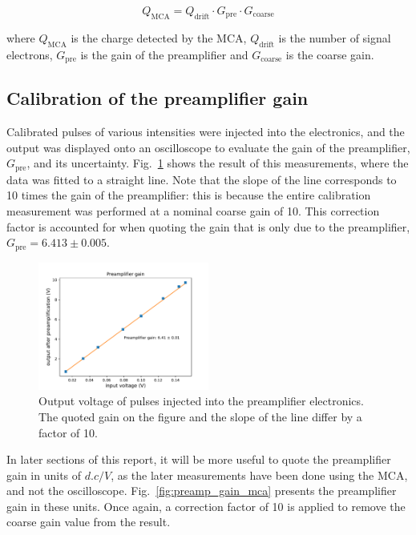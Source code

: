 \begin{equation}
  \label{eq:gain_system}
  Q_\mathrm{MCA} = Q_\mathrm{drift}\cdot G_\mathrm{pre}\cdot G_\mathrm{coarse}
\end{equation}

where $Q_\mathrm{MCA}$ is the charge detected by the MCA, $Q_\mathrm{drift}$ is the number of signal electrons, $G_\mathrm{pre}$ is the gain of the preamplifier and $G_\mathrm{coarse}$ is the coarse gain.

\subsection{Calibration of the preamp\-li\-fi\-er gain}
 Calibrated pulses of various intensities were injected into the electronics, and the output was displayed onto an oscilloscope to evaluate the gain of the preamplifier, $G_\mathrm{pre}$, and its uncertainty. Fig.~\ref{fig:preamp_gain} shows the result of this measurements, where the data was fitted to a straight line. Note that the slope of the line corresponds to 10 times the gain of the preamplifier: this is because the entire calibration measurement was performed at a nominal coarse gain of 10. This correction factor is accounted for when quoting the gain that is only due to the preamplifier, $G_\mathrm{pre} = 6.413 \pm 0.005$.

\begin{figure}[htb]
  \includegraphics[scale=0.5,width=0.5\textwidth]{graphics/preamp_gain_calibration.pdf}
  \caption{Output voltage of pulses injected into the preamplifier electronics. The quoted gain on the figure and the slope of the line differ by a factor of 10.}
  \label{fig:preamp_gain}
\end{figure}

In later sections of this report, it will be more useful to quote the preamplifier gain in units of $d.c/V$, as the later measurements have been done using the MCA, and not the oscilloscope. Fig.~\ref{fig:preamp_gain_mca} presents the preamplifier gain in these units. Once again, a correction factor of 10 is applied to remove the coarse gain value from the result.

